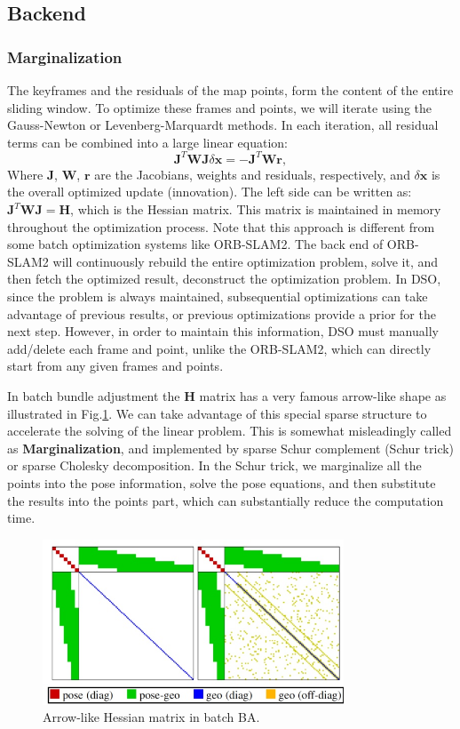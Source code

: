 \documentclass[a4paper,10pt]{article}
\begin{document}
	\subsection{Backend}
	\subsubsection{Marginalization}
	The keyframes and the residuals of the map points, form the content of the entire sliding window. To optimize these frames and points, we will iterate using the Gauss-Newton or Levenberg-Marquardt methods. In each iteration, all residual terms can be combined into a large linear equation:
	\begin{equation}
	\mathbf{J}^T \mathbf{W} \mathbf{J} \delta \mathbf{x}=-\mathbf{J}^T \mathbf{W} \mathbf{r},
	\end{equation}
	Where $\mathbf{J}$, $\mathbf{W}$, $\mathbf{r}$ are the Jacobians, weights and residuals, respectively, and $\delta \mathbf{x}$ is the overall optimized update (innovation). The left side can be written as: $\mathbf{J}^T \mathbf{WJ}=\mathbf{H}$, which is the Hessian matrix. This matrix is maintained in memory throughout the optimization process. Note that this approach is different from some batch optimization systems like ORB-SLAM2. The back end of ORB-SLAM2 will continuously rebuild the entire optimization problem, solve it, and then fetch the optimized result, deconstruct the optimization problem. In DSO, since the problem is always maintained, subsequential optimizations can take advantage of previous results, or previous optimizations provide a prior for the next step. However, in order to maintain this information, DSO must manually add/delete each frame and point, unlike the ORB-SLAM2, which can directly start from any given frames and points.
	
	In batch bundle adjustment the $\mathbf{H}$ matrix has a very famous arrow-like shape as illustrated in Fig.\ref{fig:H-dso}. We can take advantage of this special sparse structure to accelerate the solving of the linear problem. This is somewhat misleadingly called as \textbf{Marginalization}, and implemented by sparse Schur complement (Schur trick) or sparse Cholesky decomposition. In the Schur trick, we marginalize all the points into the pose information, solve the pose equations, and then substitute the results into the points part, which can substantially reduce the computation time. 
	
	\begin{figure}[!thp]
		\centering
		\includegraphics[width=0.8\textwidth]{figs/H.jpg}
		\caption{Arrow-like Hessian matrix in batch BA.}
		\label{fig:H-dso}
	\end{figure}
		
\end{document}
